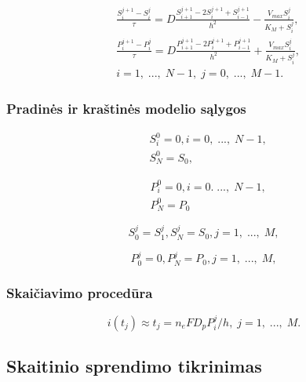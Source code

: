 \documentclass[12pt, a4paper, lithuanian]{article}
\begin{document}
\begin{equation}
\begin{aligned} 
    &\frac{S_i^{j+1} - S_i^j}{\tau} = D\frac{S_{i+1}^{j+1} -
    2S_i^{j+1} + S_{i-1}^{j+1}}{h^2} -
    \frac{V_{max} S_i^j}{K_M + S_i^j},\\ 
    &\frac{P_i^{j+1} - P_i^j}{\tau} = D\frac{P_{i+1}^{j+1} -
    2P_i^{j+1} + P_{i-1}^{j+1}}{h^2} +
    \frac{V_{max} S_i^j}{K_M + S_i^j},\\ 
    &i = 1,\;...,\; N-1,\; j=0,\;...,\;M-1.
\end{aligned}
\end{equation}

\subsubsection{Pradinės ir kraštinės modelio sąlygos}
\begin{equation}
\begin{aligned}
    &S_i^0 = 0, i = 0,\;...,\;N-1,\\
    &S_N^0 = S_0,
\end{aligned}
\end{equation}

\begin{equation}
\begin{aligned}
    &P_i^0 = 0, i = 0.\;...,\;N-1,\\
    &P_N^0 = P_0
\end{aligned}
\end{equation}

\begin{equation} 
    S_0^j = S_1^j, S_N^j = S_0, j=1,\; ...,\;M, 
\end{equation}

\begin{equation} 
    P_0^j = 0, P_N^j = P_0, j=1,\; ...,\;M, 
\end{equation}

\subsubsection{Skaičiavimo procedūra}

\begin{equation} 
    i(t_j) \approx t_j = n_eFD_pP_i^j/h,\; j=1,\;...,\;M. 
\end{equation}

\subsection{Skaitinio sprendimo tikrinimas}
\end{document}
